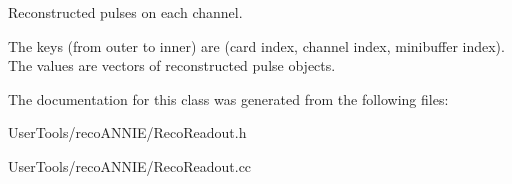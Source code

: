Reconstructed pulses on each channel. 

The keys (from outer to inner) are (card index, channel index, minibuffer index). The values are vectors of reconstructed pulse objects. 

The documentation for this class was generated from the following files\-:\begin{DoxyCompactItemize}
\item 
User\-Tools/reco\-A\-N\-N\-I\-E/Reco\-Readout.\-h\item 
User\-Tools/reco\-A\-N\-N\-I\-E/Reco\-Readout.\-cc\end{DoxyCompactItemize}
